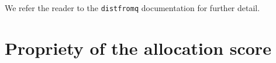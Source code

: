 \documentclass{article}\usepackage[]{graphicx}\usepackage[]{xcolor}
\begin{document}
We refer the reader to the \verb`distfromq` documentation for further detail.


\section{Propriety of the allocation score}
\label{sec:proper}
\end{document}
